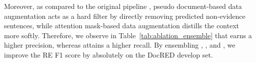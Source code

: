\begin{table}[t!]
\setlength\tabcolsep{2pt}
  \centering
{}
  \caption{RE F1 results () on the CDR and GDA test sets.
  The baseline scores are from the corresponding papers.
   scores the highest on both datasets.
Full details in Appendix~\ref{ap:c}.}
  \label{tab:bio_result}
\end{table}

Moreover, as compared to the original pipeline , pseudo document-based data augmentation  acts as a hard filter by directly removing predicted non-evidence sentences, while attention mask-based data augmentation  distills the context more softly.
Therefore, we observe in Table~\ref{tab:ablation_ensemble} that  earns a higher precision, whereas  attains a higher recall.
By ensembling , , and , we improve the RE F1 score by  absolutely on the DocRED develop set.





